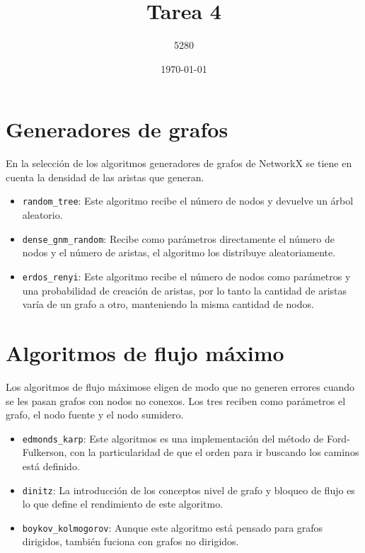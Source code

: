\documentclass{article}
\title{
Tarea 4
}
\author{5280}
\date{\today}
\begin{document}
\maketitle

\section*{Generadores de grafos} 

En la selección de los algoritmos generadores de grafos de NetworkX \citep{networkx} se tiene en cuenta la densidad de las aristas que generan.

\begin{itemize}
\item \texttt{random\_tree}: Este algoritmo recibe el número de nodos y devuelve un árbol aleatorio. 

\item \texttt{dense\_gnm\_random}: Recibe como parámetros directamente el número de nodos y el número de aristas, el algoritmo los distribuye aleatoriamente.

\item \texttt{erdos\_renyi}: Este algoritmo recibe el número de nodos como parámetros y una probabilidad de creación de aristas, por lo tanto la cantidad de aristas varía de un grafo a otro, manteniendo la misma cantidad de nodos. 
\end{itemize}

\section*{Algoritmos de flujo máximo}

Los algoritmos de flujo máximose eligen de modo que no generen errores cuando se les pasan grafos con nodos no conexos. Los tres reciben como parámetros el grafo, el nodo fuente y el nodo sumidero.

\begin{itemize}
\item \texttt{edmonds\_karp}: Este algoritmos es una implementación del método de Ford-Fulkerson, con la particularidad de que el orden para ir buscando los caminos está definido.

\item \texttt{dinitz}: La introducción de los conceptos nivel de grafo y bloqueo de flujo es lo que define el rendimiento de este algoritmo.

\item \texttt{boykov\_kolmogorov}: Aunque este algoritmo está pensado para grafos dirigidos, también fuciona con grafos no dirigidos.

\end{itemize} 
\end{document}
